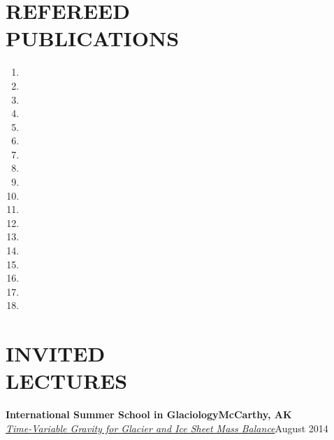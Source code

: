 \documentclass[margin,line,11pt]{res}
\begin{document}
\begin{resume}
\section{REFEREED\\ PUBLICATIONS}
	\begin{enumerate}
		\setlength{\itemindent}{-3ex}
		\item {}
		\item {}
		\item {}
		\item {}
		\item {}
		\item {}
		\item {}
		\item {}
		\item {}
		\item {}
		\item {}
		\item {}
		\item {}
		\item {}
		\item {}
		\item {}
		\item {}
		\item {}
	\end{enumerate}

\section{INVITED\\ LECTURES}
	{\bf International Summer School in Glaciology}\hfill {\bf McCarthy, AK}\\
	{\em \href{http://glaciers.gi.alaska.edu/sites/default/files/Lecture_GRACE_Sutterley2014.pdf}{Time-Variable Gravity for Glacier and Ice Sheet Mass Balance}}\hfill August 2014


\end{resume}
\end{document}
